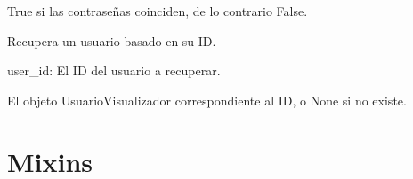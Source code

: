 \documentclass[letterpaper,10pt,spanish]{sphinxmanual}
\begin{document}
\begin{fulllineitems}
\begin{fulllineitems}
\begin{description}
\sphinxAtStartPar
True si las contraseñas coinciden, de lo contrario False.

\end{description}

\end{fulllineitems}



\begin{fulllineitems}

\pysigstartsignatures
{}
\pysigstopsignatures
\sphinxAtStartPar
Recupera un usuario basado en su ID.
\begin{description}
\sphinxAtStartPar
user\_id: El ID del usuario a recuperar.

\sphinxAtStartPar
El objeto UsuarioVisualizador correspondiente al ID, o None si no existe.

\end{description}

\end{fulllineitems}


\end{fulllineitems}



\section{Mixins}
\label{\detokenize{usuarios:mixins}}
\end{document}
